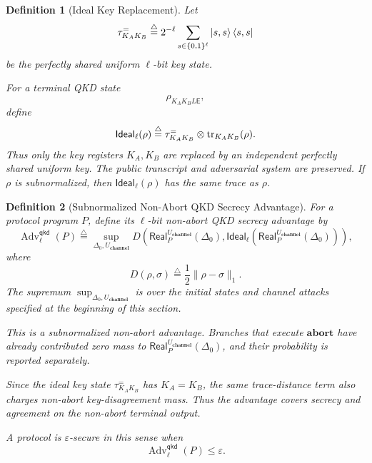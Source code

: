 \documentclass[acmsmall,screen,review,anonymous,nonacm]{acmart}
\newtheorem{definition}{Definition}[section]
\theoremstyle{defn_style}
\newcommand{\tr}{\textup{tr}}
\begin{document}
\begin{definition}[Ideal Key Replacement]
Let
\[
\tau^{=}_{K_AK_B}
\stackrel{\triangle}{=}
2^{-\ell}
\sum_{s\in\{0,1\}^{\ell}}
\ket{s,s}\bra{s,s}
\]
be the perfectly shared uniform \(\ell\)-bit key state.

For a terminal QKD state
\[
\rho_{K_AK_BL\mathsf E},
\]
define
\[
\mathsf{Ideal}_{\ell}(\rho)
\stackrel{\triangle}{=}
\tau^{=}_{K_AK_B}
\otimes
\tr_{K_AK_B}(\rho).
\]
Thus only the key registers \(K_A,K_B\) are replaced by an independent
perfectly shared uniform key.  The public transcript and adversarial system are
preserved.  If \(\rho\) is subnormalized, then
\(\mathsf{Ideal}_{\ell}(\rho)\) has the same trace as \(\rho\).
\end{definition}

\begin{definition}[Subnormalized Non-Abort QKD Secrecy Advantage]
For a protocol program \(P\), define its \(\ell\)-bit non-abort QKD secrecy
advantage by
\[
\operatorname{Adv}^{\mathsf{qkd}}_{\ell}(P)
\stackrel{\triangle}{=}
\sup_{\Delta_0,U_{\textbf{channel}}}
D\left(
\mathsf{Real}_{P}^{U_{\textbf{channel}}}(\Delta_0),
\mathsf{Ideal}_{\ell}
\left(
\mathsf{Real}_{P}^{U_{\textbf{channel}}}(\Delta_0)
\right)
\right),
\]
where
\[
D(\rho,\sigma)
\stackrel{\triangle}{=}
\frac12\|\rho-\sigma\|_1 .
\]
The supremum \(\sup_{\Delta_0,U_{\textbf{channel}}}\) is over the initial
states and channel attacks specified at the beginning of this section.

This is a subnormalized non-abort advantage. Branches that execute
\(\mathbf{abort}\) have already contributed zero mass to
\(\mathsf{Real}_{P}^{U_{\textbf{channel}}}(\Delta_0)\), and their probability
is reported separately.

Since the ideal key state \(\tau^{=}_{K_AK_B}\) has
\(K_A=K_B\), the same trace-distance term also charges non-abort
key-disagreement mass. Thus the advantage covers secrecy and agreement on the
non-abort terminal output.

A protocol is \(\varepsilon\)-secure in this sense when
\[
\operatorname{Adv}^{\mathsf{qkd}}_{\ell}(P)\leq\varepsilon .
\]
\end{definition}
\end{document}
